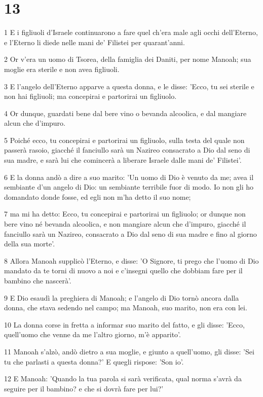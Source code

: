 \chapter{13}

\par 1 E i figliuoli d'Israele continuarono a fare quel ch'era male agli occhi dell'Eterno, e l'Eterno li diede nelle mani de' Filistei per quarant'anni.
\par 2 Or v'era un uomo di Tsorea, della famiglia dei Daniti, per nome Manoah; sua moglie era sterile e non avea figliuoli.
\par 3 E l'angelo dell'Eterno apparve a questa donna, e le disse: 'Ecco, tu sei sterile e non hai figliuoli; ma concepirai e partorirai un figliuolo.
\par 4 Or dunque, guardati bene dal bere vino o bevanda alcoolica, e dal mangiare alcun che d'impuro.
\par 5 Poiché ecco, tu concepirai e partorirai un figliuolo, sulla testa del quale non passerà rasoio, giacché il fanciullo sarà un Nazireo consacrato a Dio dal seno di sua madre, e sarà lui che comincerà a liberare Israele dalle mani de' Filistei'.
\par 6 E la donna andò a dire a suo marito: 'Un uomo di Dio è venuto da me; avea il sembiante d'un angelo di Dio: un sembiante terribile fuor di modo. Io non gli ho domandato donde fosse, ed egli non m'ha detto il suo nome;
\par 7 ma mi ha detto: Ecco, tu concepirai e partorirai un figliuolo; or dunque non bere vino né bevanda alcoolica, e non mangiare alcun che d'impuro, giacché il fanciullo sarà un Nazireo, consacrato a Dio dal seno di sua madre e fino al giorno della sua morte'.
\par 8 Allora Manoah supplicò l'Eterno, e disse: 'O Signore, ti prego che l'uomo di Dio mandato da te torni di nuovo a noi e c'insegni quello che dobbiam fare per il bambino che nascerà'.
\par 9 E Dio esaudì la preghiera di Manoah; e l'angelo di Dio tornò ancora dalla donna, che stava sedendo nel campo; ma Manoah, suo marito, non era con lei.
\par 10 La donna corse in fretta a informar suo marito del fatto, e gli disse: 'Ecco, quell'uomo che venne da me l'altro giorno, m'è apparito'.
\par 11 Manoah s'alzò, andò dietro a sua moglie, e giunto a quell'uomo, gli disse: 'Sei tu che parlasti a questa donna?' E quegli rispose: 'Son io'.
\par 12 E Manoah: 'Quando la tua parola si sarà verificata, qual norma s'avrà da seguire per il bambino? e che si dovrà fare per lui?'
